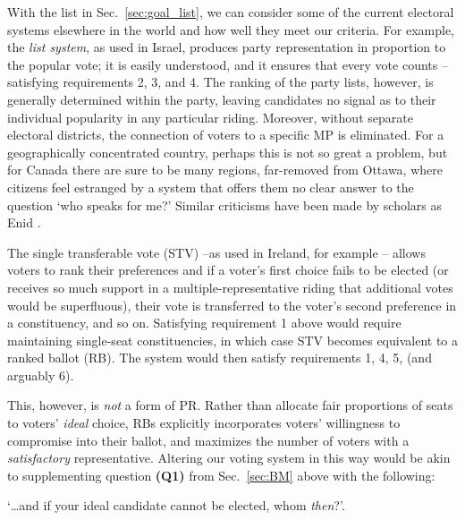 With the list in Sec.~\ref{sec:goal_list}, we can consider some of the current electoral systems elsewhere in the world and how well they meet our criteria. For example, the \emph{list system}, as used in Israel, produces party representation in proportion to the popular vote; it is easily understood, and it ensures that every vote counts \---satisfying requirements 2, 3, and 4.
The ranking of the party lists, however, is generally determined within the party, leaving candidates no signal as to their individual popularity in any particular riding. Moreover, without separate electoral districts, the connection of voters to a specific MP is eliminated.
For a geographically concentrated country, perhaps this is not so great a problem, but for Canada there are sure to be many regions, far-removed from Ottawa, where citizens feel estranged by a system that offers them no clear answer to the question `who speaks for me?' Similar criticisms have been made by scholars as Enid \citet{Lakeman}.

The single transferable vote (STV) \---as used in Ireland, for example \citep{Gallagher_2005}
\--- allows voters to  rank their preferences and if a voter's first choice fails to be elected (or receives so much support in a multiple-representative riding that additional votes would be superfluous), their vote is transferred to the voter's second preference in a constituency, and so on.
Satisfying requirement 1 above would require maintaining single-seat constituencies, in which case STV becomes  equivalent to a ranked ballot (RB). The system would then satisfy requirements 1, 4, 5, (and arguably 6).

This, however, is \emph{not} a form of PR.
Rather than allocate fair proportions of seats to voters' \emph{ideal} choice, RBs explicitly incorporates voters' willingness to compromise into their ballot, and maximizes the number of voters with a \emph{satisfactory} representative.
Altering our voting system in this way would be akin to supplementing question \textbf{(Q1)} from Sec.~\ref{sec:BM} above with the following:

\begin{tcolorbox}[colback=white!5!white,colframe=blue!55!black]
`\ldots and if your ideal candidate cannot be elected, whom \emph{then}?'.
\end{tcolorbox}

